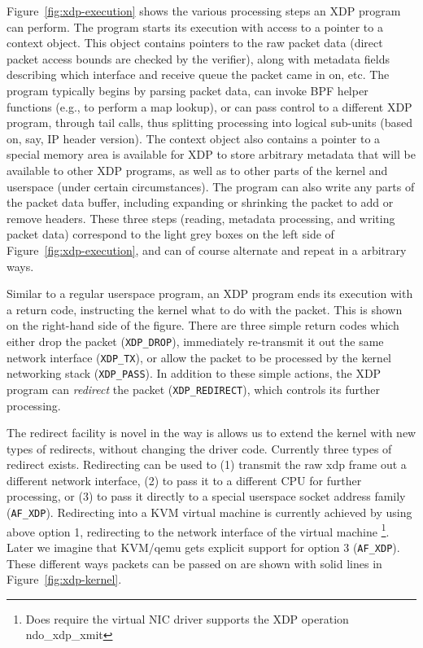 \documentclass[10pt,sigconf]{acmart}
\begin{document}
Figure~\ref{fig:xdp-execution} shows the various processing steps an XDP program
can perform. The program starts its execution with access to a pointer to a
context object. This object contains pointers to the raw packet data (direct
packet access bounds are checked by the verifier), along with metadata fields
describing which interface and receive queue the packet came in on, etc.
%
The program typically begins by parsing packet data, can invoke
BPF helper functions (e.g., to perform a map lookup), or can pass control to a
different XDP program, through tail calls, thus splitting processing into
logical sub-units (based on, say, IP header version). The context object also
contains a pointer to a special memory area is available for XDP to store
arbitrary metadata that will be available to other XDP programs, as well as to
other parts of the kernel and userspace (under certain circumstances). The
program can also write any parts of the packet data buffer, including expanding
or shrinking the packet to add or remove headers.
%
%
%
These three steps (reading,
metadata processing, and writing packet data) correspond to the light grey boxes
on the left side of Figure~\ref{fig:xdp-execution}, and can of course alternate
and repeat in a arbitrary ways.

Similar to a regular userspace program, an XDP program ends its execution with a
return code, instructing the kernel what to do with the packet. This is shown on
the right-hand side of the figure. There are three simple return codes which
either drop the packet (\texttt{XDP\_DROP}), immediately re-transmit it out the
same network interface (\texttt{XDP\_TX}), or allow the packet to be processed
by the kernel networking stack (\texttt{XDP\_PASS}).  In addition to these
simple actions, the XDP program can \emph{redirect} the packet
(\texttt{XDP\_REDIRECT}), which controls its further processing.

The redirect facility is novel in the way is allows us to extend the kernel with
new types of redirects, without changing the driver code.
%
Currently three types of redirect exists.  Redirecting can be used to (1)
transmit the raw xdp frame out a different network interface, (2) to pass it to
a different CPU for further processing, or (3) to pass it directly to a special
userspace socket address family (\texttt{AF\_XDP}).
%
Redirecting into a KVM virtual machine is currently achieved by using above
option 1, redirecting to the network interface of the virtual
machine \footnote{Does require the virtual NIC driver supports the XDP operation
  ndo\_xdp\_xmit}.  Later we imagine that KVM/qemu gets explicit support for
option 3 (\texttt{AF\_XDP}).
%
These different ways packets can be passed on are shown with solid lines in
Figure~\ref{fig:xdp-kernel}.
\end{document}
